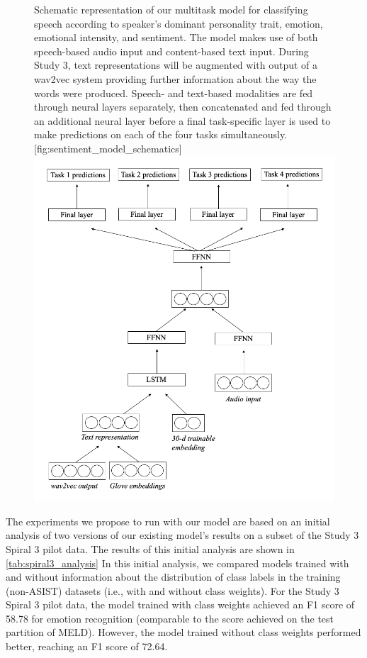 \begin{figure}
    \begin{sidecaption}{%
        Schematic representation of our multitask model
    for classifying speech according to speaker's dominant personality trait,
    emotion, emotional intensity, and sentiment. The model makes use of both
    speech-based audio input and content-based text input. During Study 3,
    text representations will be augmented with output of a wav2vec system
    providing further information about the way the words were produced.
    Speech- and text-based modalities are fed through neural layers separately,
    then concatenated and fed through an additional neural layer before a final
    task-specific layer is used to make predictions on each of the four tasks
    simultaneously. }[fig:sentiment_model_schematics]
    \includegraphics[width=\textwidth]{images/sentiment_schematics_study3.png}
    \end{sidecaption}
\end{figure}

The experiments we propose to run with our model are based on an initial
analysis of two versions of our existing model's results on a subset of the
Study 3 Spiral 3 pilot data. The results of this initial analysis are shown in
\autoref{tab:spiral3_analysis} In this initial analysis, we compared models
trained with and without information about the distribution of class labels in
the training (non-ASIST) datasets (i.e., with and without class weights).  For
the Study 3 Spiral 3 pilot data, the model trained with class weights achieved
an F1 score of 58.78 for emotion recognition (comparable to the score achieved
on the test partition of MELD). However, the model trained without class
weights performed better, reaching an F1 score of 72.64.

